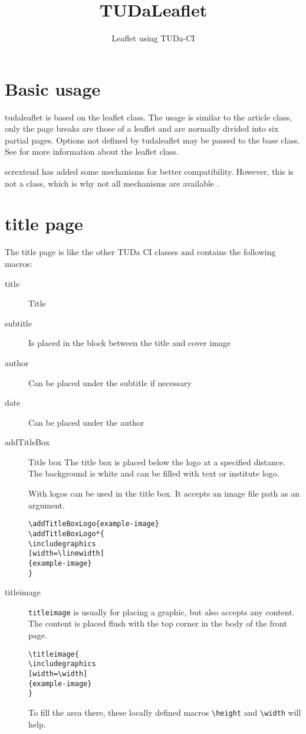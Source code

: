 \documentclass[
	english,%
	accentcolor=9c,%
]{tudaleaflet}
\newcommand*{\code}[1]{\texttt{#1}}
\newcommand*{\pkg}[1]{\textsf{#1}}
\newcommand*{\cls}[1]{\textsf{#1}}
\begin{document}
\title{TUDaLeaflet}
\subtitle{Leaflet using TUDa-CI}


\maketitle

\section{Basic usage}
\cls{tudaleaflet} is based on the \cls{leaflet} class.
The usage is similar to the article class, only the page breaks are those of a leaflet and are normally divided into six partial pages.
Options not defined by \cls{tudaleaflet} may be passed to the base class.
See \cite{leaflet} for more information about the \cls{leaflet} class.

\pkg{scrextend} has added some mechanisms for better compatibility. However, this is not a \KOMAScript class, which is why not all mechanisms are available \cite[see][]{scrguide}.

\section{title page}
The title page is like the other TUDa CI classes and contains the following macros:
\begin{description}
	\item[title] Title
	\item[subtitle] Is placed in the block between the title and cover image
	\item[author] Can be placed under the subtitle if necessary
	\item[date] Can be placed under the author
	\item[addTitleBox] Title box
	      The title box is placed below the logo at a specified distance. The background is white and can be filled with text or institute logo.

	      With \code{\addTitleBoxLogo} logos can be used in the title box.
	      It accepts an image file path as an argument.
\begin{verbatim}
\addTitleBoxLogo{example-image}
\addTitleBoxLogo*{
\includegraphics
[width=\linewidth]
{example-image}
}
\end{verbatim}
	\item[titleimage] \code{titleimage} is usually for placing a graphic, but also accepts any content. The content is placed flush with the top corner in the body of the front page.
\begin{verbatim}
\titleimage{
\includegraphics
[width=\width]
{example-image}
}
\end{verbatim}
	      To fill the area there, these locally defined macros \verb+\height+ and \verb+\width+ will help.
\end{description}
\end{document}
